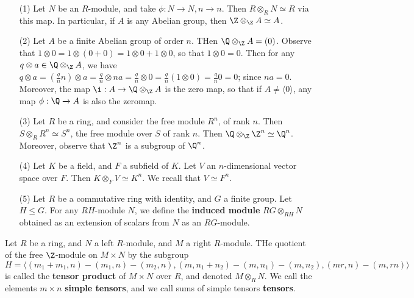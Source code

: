 \begin{example}\label{example_4.9}
    \begin{enumerate}
        \item[(1)] Let $N$ be an $R$-module, and take $\phi:N \xrightarrow{} N,
            n \xrightarrow{} n$. Then $R \otimes_R N \simeq R$ via this map. In
            particular, if $A$ is any Abelian group, then $\Z \otimes_\Z A
            \simeq A$.

        \item[(2)] Let $A$ be a finite Abelian group of order $n$. THen $\Q
            \otimes_\Z A=(0)$. Observe that $1 \otimes 0=1 \otimes (0+0)=1
            \otimes 0+1 \otimes 0$, so that $1 \otimes 0=0$. Then for any $q
            \otimes a \in \Q \otimes_\Z A$, we have $q \otimes a=(\frac{q}{n}n)
            \otimes a=\frac{q}{n} \otimes na=\frac{q}{n} \otimes 0=\frac{q}{n}(1
            \otimes 0)=\frac{q}{n}0=0$; since $na=0$. Moreover, the map $\i:A
            \xrightarrow{} \Q \otimes_\Z A$ is the zero map, so that if $A \neq
            \langle 0 \rangle$, any map $\phi:\Q \xrightarrow{} A$ is also the
            zeromap.

        \item[(3)] Let $R$ be a ring, and consider the free module $R^n$, of
            rank $n$. Then $S \otimes_R R^n \simeq S^n$, the free module over
            $S$ of rank $n$. Then $\Q \otimes_\Z \Z^n \simeq \Q^n$. Moreover,
            observe that $\Z^n$ is a subgroup of $\Q^n$.

        \item[(4)] Let $K$ be a field, and $F$ a subfield of $K$. Let $V$ an
            $n$-dimensional vector space over $F$. Then $K \otimes_F V \simeq
            K^n$. We recall that $V \simeq F^n$.

        \item[(5)] Let $R$ be a commutative ring with identity, and $G$ a finite
            group. Let $H \leq G$. For any $RH$-module $N$, we define the
            \textbf{induced module} $RG \otimes_{RH} N$ obtained as an extension
            of scalars from $N$ as an $RG$-module.
    \end{enumerate}
\end{example}

\begin{definition}
    Let $R$ be a ring, and $N$ a left $R$-module, and $M$ a right $R$-module.
    THe quotient of the free $\Z$-module on $M \times N$ by the subgroup
    \begin{equation*}
        H=\langle (m_1+m_1,n)-(m_1,n)-(m_2,n), (m,n_1+n_2)-(m,n_1)-(m,n_2), (mr,n)-(m,rn) \rangle
    \end{equation*}
    is called the \textbf{tensor product} of $M \times N$ over $R$, and denoted
    $M \otimes_R N$. We call the elements $m \times n$ \textbf{simple tensors},
    and we call sums of simple tensors \textbf{tensors}.
\end{definition}

